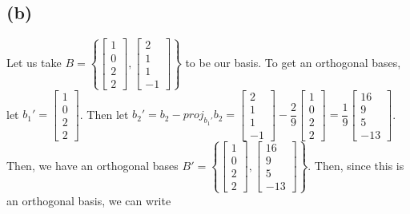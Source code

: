 \documentclass{article}
\begin{document}
\subsection*{(b)}
Let us take $B = \left\{ \begin{bmatrix}1\\0\\2\\2\end{bmatrix}, \begin{bmatrix}2\\1\\1\\-1\end{bmatrix} \right\}$ to be our basis. To get an orthogonal bases, let $b_1' = \begin{bmatrix}1\\0\\2\\2\end{bmatrix}$. Then let $b_2'= b_2 - proj_{b_1'}b_2 = \begin{bmatrix}2\\1\\1\\-1 \end{bmatrix} - \dfrac{2}{9}\begin{bmatrix}1\\0\\2\\2\end{bmatrix} = \dfrac{1}{9}\begin{bmatrix}16\\9\\5\\-13\end{bmatrix}$. Then, we have an orthogonal bases $B' =\left\{ \begin{bmatrix}1\\0\\2\\2\end{bmatrix}, \begin{bmatrix}16\\9\\5\\-13\end{bmatrix} \right\}$.
Then, since this is an orthogonal basis, we can write 
\end{document}
